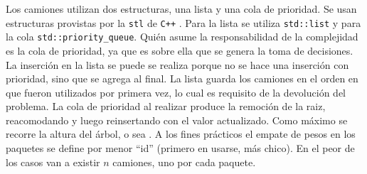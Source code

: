 \documentclass[11pt, a4paper, twoside]{article}
\begin{document}
Los camiones utilizan dos estructuras, una lista y una cola de prioridad.
Se usan estructuras provistas por la \texttt{stl} de \texttt{C++} .
Para la lista se utiliza \texttt{std::list} y para la cola \texttt{std::priority\_queue}.
Quién asume la responsabilidad de la complejidad es la cola de prioridad,
ya que es sobre ella que se genera la toma de decisiones.
La inserción en la lista se puede se realiza  porque no se
hace una inserción con prioridad, sino que se agrega al final.
La lista guarda los camiones en el orden en que fueron utilizados por primera vez,
lo cual es requisito de la devolución del problema.
La cola de prioridad al realizar  produce
la remoción de la raiz, reacomodando y luego reinsertando con el valor actualizado.
Como máximo se recorre la altura del árbol, o sea .
A los fines prácticos el empate de pesos en los paquetes
se define por menor \enquote{id} (primero en usarse, más chico).
En el peor de los casos van a existir $n$ camiones, uno por cada paquete.
\end{document}
